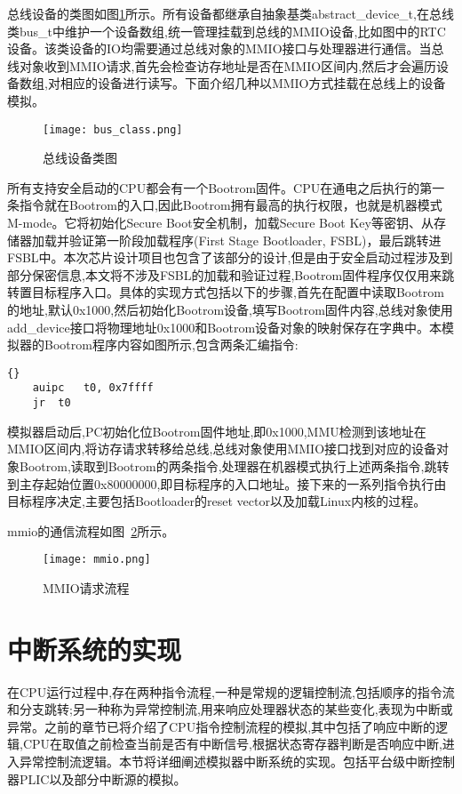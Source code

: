 总线设备的类图如图\ref{fig:bus_class}所示。所有设备都继承自抽象基类abstract\_device\_t,在总线类bus\_t中维护一个设备数组,统一管理挂载到总线的MMIO设备,比如图中的RTC设备。该类设备的IO均需要通过总线对象的MMIO接口与处理器进行通信。当总线对象收到MMIO请求,首先会检查访存地址是否在MMIO区间内,然后才会遍历设备数组,对相应的设备进行读写。下面介绍几种以MMIO方式挂载在总线上的设备模拟。
\begin{figure}[h]
    \centering
    \texttt{[image: bus\_class.png]}
    \caption{总线设备类图}
    \label{fig:bus_class}
\end{figure}


所有支持安全启动的CPU都会有一个Bootrom固件。CPU在通电之后执行的第一条指令就在Bootrom的入口,因此Bootrom拥有最高的执行权限，也就是机器模式M-mode。它将初始化Secure Boot安全机制，加载Secure Boot Key等密钥、从存储器加载并验证第一阶段加载程序(First Stage Bootloader, FSBL)，最后跳转进FSBL中。本次芯片设计项目也包含了该部分的设计,但是由于安全启动过程涉及到部分保密信息,本文将不涉及FSBL的加载和验证过程,Bootrom固件程序仅仅用来跳转置目标程序入口。具体的实现方式包括以下的步骤,首先在配置中读取Bootrom的地址,默认0x1000,然后初始化Bootrom设备,填写Bootrom固件内容,总线对象使用add\_device接口将物理地址0x1000和Bootrom设备对象的映射保存在字典中。本模拟器的Bootrom程序内容如图所示,包含两条汇编指令:
\begin{lstlisting}{}
    auipc	t0, 0x7ffff
    jr 	t0
\end{lstlisting}
模拟器启动后,PC初始化位Bootrom固件地址,即0x1000,MMU检测到该地址在MMIO区间内,将访存请求转移给总线,总线对象使用MMIO接口找到对应的设备对象Bootrom,读取到Bootrom的两条指令,处理器在机器模式执行上述两条指令,跳转到主存起始位置0x80000000,即目标程序的入口地址。接下来的一系列指令执行由目标程序决定,主要包括Bootloader的reset vector以及加载Linux内核的过程。

mmio的通信流程如图~\ref{fig:mmio}所示。
\begin{figure}[h]
    \centering
    \texttt{[image: mmio.png]}
    \caption{MMIO请求流程}
    \label{fig:mmio}
\end{figure}


\section{中断系统的实现}

在CPU运行过程中,存在两种指令流程,一种是常规的逻辑控制流,包括顺序的指令流和分支跳转;另一种称为异常控制流,用来响应处理器状态的某些变化,表现为中断或异常。之前的章节已将介绍了CPU指令控制流程的模拟,其中包括了响应中断的逻辑,CPU在取值之前检查当前是否有中断信号,根据状态寄存器判断是否响应中断,进入异常控制流逻辑。本节将详细阐述模拟器中断系统的实现。包括平台级中断控制器PLIC以及部分中断源的模拟。


